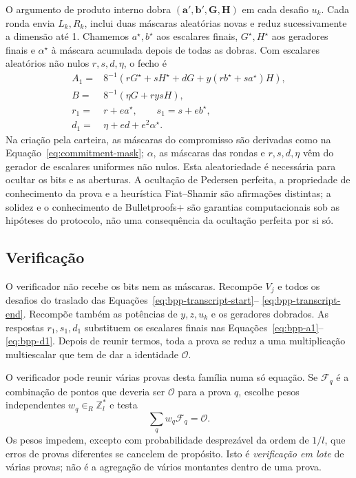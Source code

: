 O argumento de produto interno dobra
\((\boldsymbol a',\boldsymbol b',
  \boldsymbol G,\boldsymbol H)\) em cada desafio \(u_k\). Cada ronda envia
\(L_k,R_k\), inclui duas máscaras aleatórias novas e reduz sucessivamente a
dimensão até 1. Chamemos \(a^\star,b^\star\) aos escalares finais,
\(G^\star,H^\star\) aos geradores finais e \(\alpha^\star\) à máscara
acumulada depois de todas as dobras.
Com escalares aleatórios não nulos \(r,s,d,\eta\), o fecho é
\begin{align}
 A_1={}&8^{-1}\!\left(
  rG^\star+sH^\star+dG+
  y(rb^\star+sa^\star)H\right),\label{eq:bpp-a1}\\
 B={}&8^{-1}\!\left(\eta G+rysH\right),\label{eq:bpp-b}\\
 r_1={}&r+ea^\star,\qquad
 s_1=s+eb^\star,\label{eq:bpp-rs}\\
 d_1={}&\eta+ed+e^2\alpha^\star.
 \label{eq:bpp-d1}
\end{align}
Na criação pela carteira, as máscaras do compromisso são derivadas como na
Equação~\eqref{eq:commitment-mask}; \(\alpha\), as máscaras das rondas e
\(r,s,d,\eta\) vêm do gerador de escalares uniformes não nulos. Esta
aleatoriedade é necessária para ocultar os bits e as aberturas. A ocultação de
Pedersen perfeita, a propriedade de conhecimento da prova e a heurística
Fiat--Shamir são afirmações distintas; a solidez e o conhecimento de
Bulletproofs+ são garantias computacionais sob as hipóteses do protocolo, não
uma consequência da ocultação perfeita por si só.

\subsection{Verificação}
\label{sec:bpp_ver}

O verificador não recebe os bits nem as máscaras. Recompõe \(V_j\) e todos os
desafios do traslado das Equações~\eqref{eq:bpp-transcript-start}--
\eqref{eq:bpp-transcript-end}. Recompõe também as potências de \(y,z,u_k\) e os
geradores dobrados. As respostas \(r_1,s_1,d_1\) substituem os escalares finais nas
Equações~\eqref{eq:bpp-a1}--\eqref{eq:bpp-d1}. Depois de reunir termos, toda a
prova se reduz a uma multiplicação multiescalar que tem de dar a identidade
\(\mathcal O\).

O verificador pode reunir várias provas desta família numa só equação.
Se \(\mathcal F_q\) é a combinação de pontos que deveria ser
\(\mathcal O\) para a prova \(q\), escolhe pesos independentes
\(w_q\in_R\mathbb Z_l^*\) e testa
\begin{equation}
 \sum_q w_q\mathcal F_q=\mathcal O.
 \label{eq:bpp-batch}
\end{equation}
Os pesos impedem, excepto com probabilidade desprezável da ordem de \(1/l\),
que erros de provas diferentes se cancelem de propósito. Isto é
\emph{verificação em lote} de várias provas; não é a agregação de vários
montantes dentro de uma prova.

